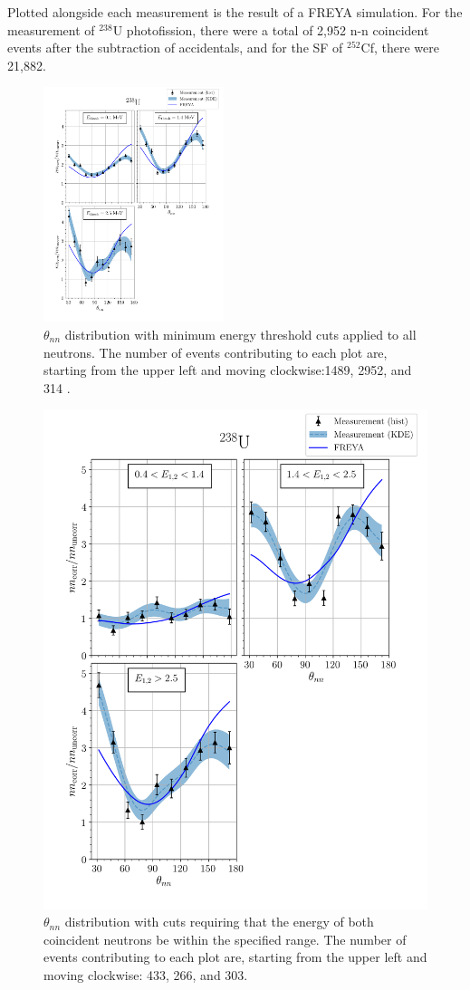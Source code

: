 \documentclass[%
 reprint,
 amsmath,amssymb,
 aps,
 nofootinbib
]{revtex4-1}
\begin{document}
Plotted alongside each measurement is the result of a FREYA simulation.
For the measurement of $^{238}$U photofission, there were a total of 2,952 n-n coincident events after the subtraction of accidentals, and for the SF of $^{252}$Cf, there were  21,882.
\FloatBarrier
\begin{figure}
\centering
    \includegraphics[width = 0.47\textwidth]{FinalDUResultw_freya0KDE.png}
    \caption{$\theta_{nn}$ distribution with minimum energy threshold cuts applied to all neutrons.
    The number of events contributing to each plot are, starting from the upper left and moving clockwise:1489, 2952, and 314 .}
    \label{fig:DU(0)}
\end{figure}
\begin{figure}
\centering
    \includegraphics[width = .47\textwidth]{FinalDUResultw_freya2KDE.png}
    \caption{ $\theta_{nn}$ distribution with cuts requiring that the energy of both coincident neutrons be within the specified range.
    The number of events contributing to each plot are, starting from the upper left and moving clockwise: 433, 266, and 303.}
    \label{fig:DU(2)}
\end{figure}
\end{document}
